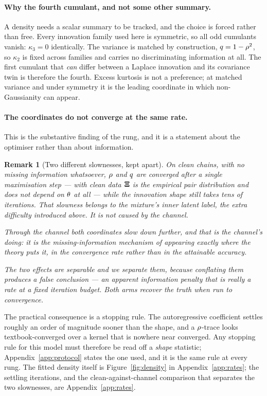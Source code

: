 \documentclass{article}
\newtheorem{remark}{Remark}
\begin{document}
\paragraph{Why the fourth cumulant, and not some other summary.} A density needs a scalar summary
to be tracked, and the choice is forced rather than free. Every innovation family used here is
symmetric, so all odd cumulants vanish: $\kappa_3=0$ identically. The variance is matched by
construction, $q=1-\rho^2$, so $\kappa_2$ is fixed across families and carries no
discriminating information at all. The first cumulant that \emph{can} differ between a Laplace
innovation and its covariance twin is therefore the fourth. Excess kurtosis is not a preference;
at matched variance and under symmetry it is the leading coordinate in which non-Gaussianity can
appear.

\paragraph{The coordinates do not converge at the same rate.} This is the substantive finding of
the rung, and it is a statement about the optimiser rather than about information.

\begin{remark}[Two different slownesses, kept apart]
\label{rem:rates}
On \emph{clean} chains, with no missing information whatsoever, $\rho$ and $q$ are converged
after a single maximisation step --- with clean data $\mathbf{\Xi}$ is the empirical pair distribution and
does not depend on $\theta$ at all --- while the innovation shape still takes tens of iterations.
That slowness belongs to the mixture's inner latent label, the extra difficulty introduced above. It is not caused by the channel.

Through the channel both coordinates slow down further, and \emph{that} is the channel's doing:
it is the missing-information mechanism of \citet{dempster1977} appearing exactly where the theory
puts it, in the convergence rate rather than in the attainable accuracy.

The two effects are separable and we separate them, because conflating them produces a false
conclusion --- an apparent \emph{information} penalty that is really a rate at a fixed iteration
budget. Both arms recover the truth when run to convergence.
\end{remark}

\noindent
The practical consequence is a stopping rule. The autoregressive coefficient settles roughly an
order of magnitude sooner than the shape, and a $\rho$-trace looks textbook-converged over a
kernel that is nowhere near converged. Any stopping rule for this model must therefore be read off
a \emph{shape} statistic; Appendix~\ref{app:protocol} states the one used, and it is the same rule at
every rung. The fitted density itself is Figure~\ref{fig:density} in Appendix~\ref{app:rates}; the settling iterations, and
the clean-against-channel comparison that separates the two slownesses, are
Appendix~\ref{app:rates}.
\end{document}
